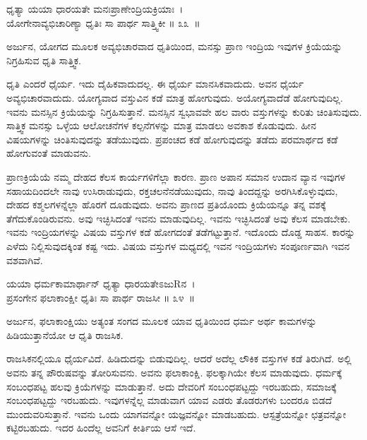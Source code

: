\begin{shloka}
ಧೃತ್ಯಾ ಯಯಾ ಧಾರಯತೇ ಮನಃಪ್ರಾಣೇಂದ್ರಿಯಕ್ರಿಯಾಃ~।\\ಯೋಗೇನಾವ್ಯಭಿಚಾರಿಣ್ಯಾ ಧೃತಿಃ ಸಾ ಪಾರ್ಥ ಸಾತ್ತ್ವಿಕೀ \hfill॥ ೩೩~॥
\end{shloka}

\begin{artha}
ಅರ್ಜುನ, ಯೋಗದ ಮೂಲಕ ಅವ್ಯಭಿಚಾರವಾದ ಧೃತಿಯಿಂದ, ಮನಸ್ಸು ಪ್ರಾಣ ಇಂದ್ರಿಯ ಇವುಗಳ ಕ್ರಿಯೆಯನ್ನು ನಿಗ್ರಹಿಸುವ ಧೃತಿ ಸಾತ್ತ್ವಿಕ.
\end{artha}

ಧೃತಿ ಎಂದರೆ ಧೈರ್ಯ. ಇದು ದೈಹಿಕವಾದುದಲ್ಲ. ಈ ಧೈರ್ಯ ಮಾನಸಿಕವಾದುದು. ಅವನ ಧೈರ್ಯ ಅವ್ಯಭಿಚಾರವಾದುದು. ಯೋಗ್ಯವಾದ ವಸ್ತುವಿನ ಕಡೆ ಮಾತ್ರ ಹೋಗುವುದು. ಅಯೋಗ್ಯವಾದೆಡೆ ಹೋಗುವುದಿಲ್ಲ. ಇವನು ಮನಸ್ಸಿನ ಕ್ರಿಯೆಯನ್ನು ನಿಗ್ರಹಿಸುತ್ತಾನೆ. ಮನಸ್ಸಿನ ಸ್ವಭಾವವೇ ಹಲ ವಾರು ವಸ್ತುಗಳನ್ನು ಕುರಿತು ಚಿಂತಿಸುವುದು. ಸಾತ್ತ್ವಿಕ ಮನಸ್ಸು ಒಳ್ಳೆಯ ಆಲೋಚನೆಗಳ ಕಲ್ಪನೆಗಳನ್ನು ಮಾತ್ರ ಮಾಡಲು ಅವಕಾಶ ಕೊಡುವುದು. ಹೀನ ವಿಷಯಗಳನ್ನು ಚಿಂತಿಸುವುದನ್ನು ತಡೆಯುವುದು. ಪ್ರಪಂಚದ ಕಡೆ ಹೋಗುವುದನ್ನು ತಡೆದು ಪರಮಾರ್ಥದ ಕಡೆ ಹೋಗುವಂತೆ ಮಾಡುವನು. 

ಪ್ರಾಣಕ್ರಿಯೆಯೆ ನಮ್ಮ ದೇಹದ ಕೆಲಸ ಕಾರ್ಯಗಳಿಗೆಲ್ಲಾ ಕಾರಣ. ಪ್ರಾಣ ಅಪಾನ ಸಮಾನ ಉದಾನ ವ್ಯಾನ ಇವುಗಳ ಸಹಾಯದಿಂದಲೇ ನಾವು ಉಸಿರಾಡುವುದು, ರಕ್ತಚಲನೆ\break ನಡೆಯುವುದು, ನಾವು ತಿಂದದ್ದನ್ನು ಅರಗಿಸಿಕೊಳ್ಳುವುದು, ದೇಹದ ಕಶ್ಮಲಗಳನ್ನೆಲ್ಲಾ ಹೊರಗೆ ದೂಡುವುದು. ಅವನು ಪ್ರಾಣದ ಪ್ರತಿಯೊಂದು ಕ್ರಿಯೆಯನ್ನೂ ತನ್ನ ವಶಕ್ಕೆ ತೆಗೆದುಕೊಂಡಿರುವನು. ಅವು ಇಚ್ಛಿಸಿದಂತೆ ಇವನು ಮಾಡುವುದಿಲ್ಲ. ಇವನು ಇಚ್ಛಿಸಿದಂತೆ ಅವು ಕೆಲಸ ಮಾಡಬೇಕು. ಇವನು ಇಂದ್ರಿಯಗಳನ್ನು ವಿಷಯ ವಸ್ತುಗಳ ಕಡೆ ಹೋಗದಂತೆ ತಡೆಗಟ್ಟುತ್ತಾನೆ. ಇದೊಂದು ದೊಡ್ಡ ಸಾಹಸ. ಕಾರನ್ನು ಎಳೆದು ನಿಲ್ಲಿಸುವುದಕ್ಕಿಂತ ಕಷ್ಟ ಇದು. ವಿಷಯ ವಸ್ತುಗಳ ಮಧ್ಯದಲ್ಲಿ ಇವನ ಇಂದ್ರಿಯಗಳು ಸಂಪೂರ್ಣವಾಗಿ ಇವನ ವಶವಾಗಿವೆ.

\begin{shloka}
ಯಯಾ ಧರ್ಮಕಾಮಾರ್ಥಾನ್ ಧೃತ್ಯಾ ಧಾರಯತೇಽಜುRನ~।\\ಪ್ರಸಂಗೇನ ಫಲಾಕಾಂಕ್ಷೀ ಧೃತಿಃ ಸಾ ಪಾರ್ಥ ರಾಜಸೀ \hfill॥ ೩೪~॥
\end{shloka}

\begin{artha}
ಅರ್ಜುನ, ಫಲಾಕಾಂಕ್ಷಿಯು ಅತ್ಯಂತ ಸಂಗದ ಮೂಲಕ ಯಾವ ಧೃತಿಯಿಂದ ಧರ್ಮ ಅರ್ಥ ಕಾಮಗಳನ್ನು ಹಿಡಿಯುತ್ತಾನೆಯೋ ಆ ಧೃತಿ ರಾಜಸಿಕ.
\end{artha}

ರಾಜಸಿಕನಲ್ಲಿಯೂ ಧೈರ್ಯವಿದೆ. ಹಿಡಿದುದನ್ನು ಬಿಡುವುದಿಲ್ಲ. ಆದರೆ ಅದೆಲ್ಲ ಲೌಕಿಕ ವಸ್ತುಗಳ ಕಡೆ ತಿರುಗಿದೆ. ಅಲ್ಲಿ ಅವನು ತನ್ನ ಪೌರುಷವನ್ನು ತೋರಿಸುವನು. ಅವನು ಫಲಾಕಾಂಕ್ಷಿ. ಫಲಕ್ಕಾಗಿಯೇ ಕೆಲಸ ಮಾಡುವುದು. ಧರ್ಮಕ್ಕೆ ಸಂಬಂಧಪಟ್ಟ ಹಲವು ಕ್ರಿಯೆಗಳನ್ನು ಮಾಡುತ್ತಾನೆ. ಅದು ದೇವರಿಗೆ ಸಂಬಂಧಪಟ್ಟದ್ದು ಇರಬಹುದು, ಸಮಾಜಕ್ಕೆ ಸಂಬಂಧಪಟ್ಟದ್ದು ಇರಬಹುದು. ಇವುಗಳನ್ನೆಲ್ಲ ಮಾಡುವಾಗ ಯಾವ ಎಡರು ತೊಡರುಗಳು ಬಂದರೂ ಬಿಡದೆ ಮುಂದುವರಿಸುತ್ತಾನೆ. ಇವನು ಒಂದು ಯಾಗವನ್ನೋ ಯಜ್ಞವನ್ನೋ ಮಾಡಬಹುದು. ಆಸ್ಪತ್ರೆ\-ಯನ್ನೋ ಛತ್ರವನ್ನೋ ಕಟ್ಟಿರಬಹುದು. ಇದರ ಹಿಂದೆಲ್ಲ ಅವನಿಗೆ ಕೀರ್ತಿಯ ಆಸೆ ಇದೆ.

